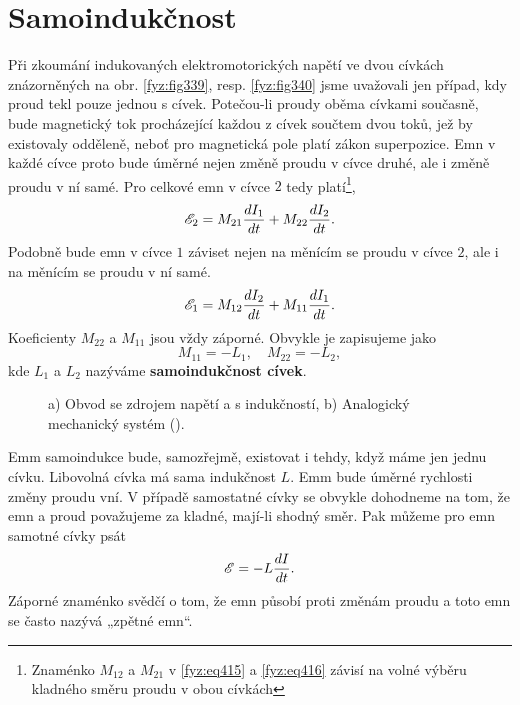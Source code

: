 \section{Samoindukčnost}\label{fyz:IIchapXVIIsecVII}
  Při zkoumání indukovaných elektromotorických napětí ve dvou cívkách znázorněných na obr. 
  \ref{fyz:fig339}, resp. \ref{fyz:fig340} jsme uvažovali jen případ, kdy proud tekl pouze jednou s 
  cívek. Potečou-li proudy oběma cívkami současně, bude magnetický tok procházející každou z cívek 
  součtem dvou toků, jež by existovaly odděleně, neboť pro magnetická pole platí zákon superpozice. 
  Emn v každé cívce proto bude úměrné nejen změně proudu v cívce druhé, ale i změně proudu v ní 
  samé. Pro celkové emn v cívce \(2\) tedy platí\footnote{Znaménko \(M_{12}\) a  \(M_{21}\) v 
  \ref{fyz:eq415} a \ref{fyz:eq416} závisí na volné výběru kladného směru proudu v obou cívkách},
  \begin{equation}\label{fyz:eq415}
    \mathscr{E}_2 = M_{21}\dfrac{d I_1}{d t} + M_{22}\dfrac{d I_2}{d t}.
  \end{equation}
  Podobně bude emn v cívce \(1\) záviset nejen na měnícím se proudu v cívce \(2\), ale i na měnícím 
  se proudu v ní samé.
  \begin{equation}\label{fyz:eq416}
    \mathscr{E}_1 = M_{12}\dfrac{d I_2}{d t} + M_{11}\dfrac{d I_1}{d t}.
  \end{equation}
  Koeficienty \(M_{22}\) a \(M_{11}\) jsou vždy záporné. Obvykle je zapisujeme jako 
  \begin{equation}\label{fyz:eq417}
    M_{11} = -L_1,\quad  M_{22} = - L_2,
  \end{equation}
  kde \(L_1\) a \(L_2\) nazýváme \textbf{samoindukčnost cívek}. 
  
  \begin{figure}[hb!]
    \centering
    \caption{a) Obvod se zdrojem napětí a s indukčností, b) Analogický mechanický systém
             (\cite[s.~307]{Feynman02}).}
    \label{fyz:fig341}
  \end{figure}
  
  Emm samoindukce bude, samozřejmě, existovat i tehdy, když máme jen jednu cívku. Libovolná cívka 
  má sama indukčnost \(L\). Emm bude úměrné rychlosti změny proudu vní. V případě samostatné cívky 
  se obvykle dohodneme na tom, že emn a proud považujeme za kladné, mají-li shodný směr. Pak můžeme 
  pro emn samotné cívky psát
  \begin{equation}\label{fyz:eq418}
    \mathscr{E} = - L\dfrac{d I}{d t}.
  \end{equation}
  Záporné znaménko svědčí o tom, že emn působí proti změnám proudu a toto emn se často nazývá 
  „zpětné emn“.
  
